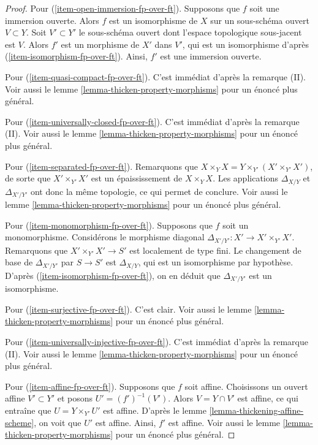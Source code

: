 \begin{proof}
\medskip\noindent
Pour (\ref{item-open-immersion-fp-over-ft}). Supposons que $f$ soit une immersion ouverte.
Alors $f$ est un isomorphisme de $X$ sur un sous-schéma ouvert $V \subset Y$.
Soit $V' \subset Y'$ le sous-schéma ouvert dont l'espace topologique
sous-jacent est $V$. Alors $f'$ est un morphisme de $X'$ dans $V'$, qui est un isomorphisme d'après
(\ref{item-isomorphism-fp-over-ft}). Ainsi, $f'$ est une immersion ouverte.

\medskip\noindent
Pour (\ref{item-quasi-compact-fp-over-ft}). C'est immédiat d'après la remarque (II). Voir aussi
le lemme \ref{lemma-thicken-property-morphisms} pour un énoncé plus général.

\medskip\noindent
Pour (\ref{item-universally-closed-fp-over-ft}). C'est immédiat d'après la remarque (II). Voir
aussi le lemme \ref{lemma-thicken-property-morphisms} pour un énoncé plus général.

\medskip\noindent
Pour (\ref{item-separated-fp-over-ft}). Remarquons que
$X \times_Y X = Y \times_{Y'} (X' \times_{Y'} X')$, de sorte que
$X' \times_{Y'} X'$ est un épaississement de $X \times_Y X$.
Les applications $\Delta_{X/Y}$ et $\Delta_{X'/Y'}$ ont donc la même
topologie, ce qui permet de conclure. Voir aussi
le lemme \ref{lemma-thicken-property-morphisms} pour un énoncé plus général.

\medskip\noindent
Pour (\ref{item-monomorphism-fp-over-ft}). Supposons que $f$ soit un monomorphisme.
Considérons le morphisme diagonal $\Delta_{X'/Y'} : X' \to X' \times_{Y'} X'$.
Remarquons que $X' \times_{Y'} X' \to S'$ est localement de type fini.
Le changement de base de $\Delta_{X'/Y'}$ par $S \to S'$ est $\Delta_{X/Y}$,
qui est un isomorphisme par hypothèse. D'après (\ref{item-isomorphism-fp-over-ft}),
on en déduit que $\Delta_{X'/Y'}$ est un isomorphisme.

\medskip\noindent
Pour (\ref{item-surjective-fp-over-ft}). C'est clair. Voir aussi
le lemme \ref{lemma-thicken-property-morphisms} pour un énoncé plus général.

\medskip\noindent
Pour (\ref{item-universally-injective-fp-over-ft}).
C'est immédiat d'après la remarque (II). Voir aussi
le lemme \ref{lemma-thicken-property-morphisms} pour un énoncé plus général.

\medskip\noindent
Pour (\ref{item-affine-fp-over-ft}). Supposons que $f$ soit affine. Choisissons un
ouvert affine $V' \subset Y'$ et posons $U' = (f')^{-1}(V')$.
Alors $V = Y \cap V'$ est affine, ce qui entraîne que
$U = Y \times_{Y'} U'$ est affine. D'après
le lemme \ref{lemma-thickening-affine-scheme},
on voit que $U'$ est affine. Ainsi, $f'$ est affine. Voir aussi
le lemme \ref{lemma-thicken-property-morphisms} pour un énoncé plus général.


\end{proof}
